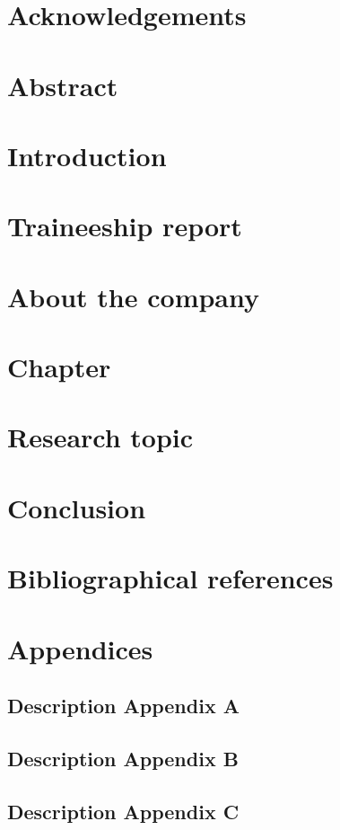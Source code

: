 \documentclass[12pt,a4paper]{report}
\newcommand\blankpage{\null\thispagestyle{empty}\newpage}
\begin{document}
  

  \blankpage

  

  \chapter*{Acknowledgements}

  \chapter*{Abstract}


  \tableofcontents

  \listoffigures

  \listoftables
  \printglossary[title={List of Abbreviations}]

  \chapter{Introduction} 

  \chapter{Traineeship report}

  \chapter{About the company}

  \chapter{Chapter}

  \chapter{Research topic}
  

  \chapter*{Conclusion}

  \chapter*{Bibliographical references}

  \chapter{Appendices}
    \section{Description Appendix A}
    \section{Description Appendix B}
    \section{Description Appendix C}
\end{document}
